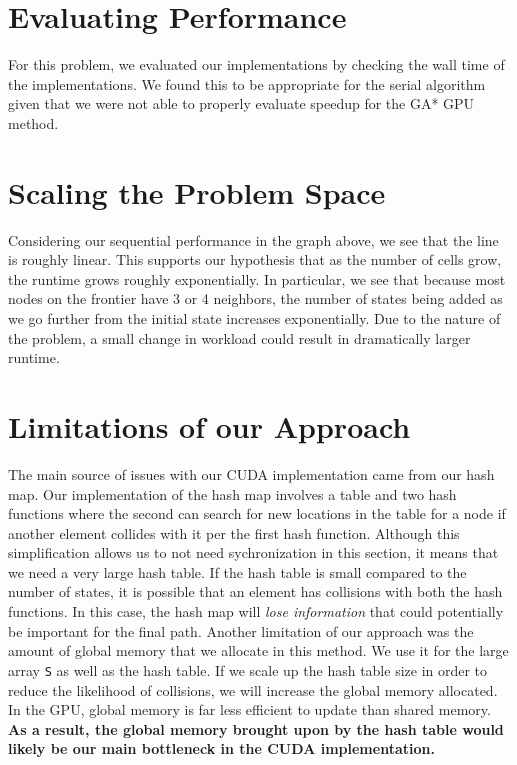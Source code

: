 \section{Evaluating Performance}
For this problem, we evaluated our implementations by checking the wall time of the implementations. We found this to be appropriate for the serial algorithm given that we were not able to properly evaluate speedup for the GA* GPU method.

\section{Scaling the Problem Space}
Considering our sequential performance in the graph above, we see that the line is roughly linear. This supports our hypothesis that as the number of cells grow, the runtime grows roughly exponentially. In particular, we see that because most nodes on the frontier have 3 or 4 neighbors, the number of states being added as we go further from the initial state increases exponentially. Due to the nature of the problem, a small change in workload could result in dramatically larger runtime.

\section{Limitations of our Approach}
The main source of issues with our CUDA implementation came from our hash map. Our implementation of the hash map involves a table and two hash functions where the second can search for new locations in the table for a node if another element collides with it per the first hash function. Although this simplification allows us to not need sychronization in this section, it means that we need a very large hash table. If the hash table is small compared to the number of states, it is possible that an element has collisions with both the hash functions. In this case, the hash map will \textit{lose information} that could potentially be important for the final path.\newline\newline
Another limitation of our approach was the amount of global memory that we allocate in this method. We use it for the large array \verb|S| as well as the hash table. If we scale up the hash table size in order to reduce the likelihood of collisions, we will increase the global memory allocated. In the GPU, global memory is far less efficient to update than shared memory. \textbf{As a result, the global memory brought upon by the hash table would likely be our main bottleneck in the CUDA implementation.}

